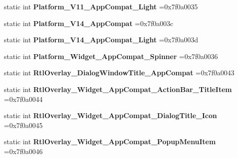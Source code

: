 \begin{DoxyCompactItemize}
static int {\bfseries Platform\+\_\+\+V11\+\_\+\+App\+Compat\+\_\+\+Light} =0x7f0a0035
\item 
\mbox{\label{classandroid_1_1support_1_1v7_1_1recyclerview_1_1R_1_1style_a12964b3e2744ef49ffec11e64898a3ec}} 
static int {\bfseries Platform\+\_\+\+V14\+\_\+\+App\+Compat} =0x7f0a003c
\item 
\mbox{\label{classandroid_1_1support_1_1v7_1_1recyclerview_1_1R_1_1style_ac68b42cde4fe3b8a7d69ddd533c917c4}} 
static int {\bfseries Platform\+\_\+\+V14\+\_\+\+App\+Compat\+\_\+\+Light} =0x7f0a003d
\item 
\mbox{\label{classandroid_1_1support_1_1v7_1_1recyclerview_1_1R_1_1style_ad1985afdd1d86e225bf8fd9974a85a49}} 
static int {\bfseries Platform\+\_\+\+Widget\+\_\+\+App\+Compat\+\_\+\+Spinner} =0x7f0a0036
\item 
\mbox{\label{classandroid_1_1support_1_1v7_1_1recyclerview_1_1R_1_1style_a5b6a81ec1de88e6bd3cf2b64eb7307b7}} 
static int {\bfseries Rtl\+Overlay\+\_\+\+Dialog\+Window\+Title\+\_\+\+App\+Compat} =0x7f0a0043
\item 
\mbox{\label{classandroid_1_1support_1_1v7_1_1recyclerview_1_1R_1_1style_ad7e1d664a2441efce7ac37cb609d3d92}} 
static int {\bfseries Rtl\+Overlay\+\_\+\+Widget\+\_\+\+App\+Compat\+\_\+\+Action\+Bar\+\_\+\+Title\+Item} =0x7f0a0044
\item 
\mbox{\label{classandroid_1_1support_1_1v7_1_1recyclerview_1_1R_1_1style_a84a9103cfc2d6dd2504abb18ffca3125}} 
static int {\bfseries Rtl\+Overlay\+\_\+\+Widget\+\_\+\+App\+Compat\+\_\+\+Dialog\+Title\+\_\+\+Icon} =0x7f0a0045
\item 
\mbox{\label{classandroid_1_1support_1_1v7_1_1recyclerview_1_1R_1_1style_a0fdd00dca0486d5ece870138b7f6e782}} 
static int {\bfseries Rtl\+Overlay\+\_\+\+Widget\+\_\+\+App\+Compat\+\_\+\+Popup\+Menu\+Item} =0x7f0a0046

\end{DoxyCompactItemize}
